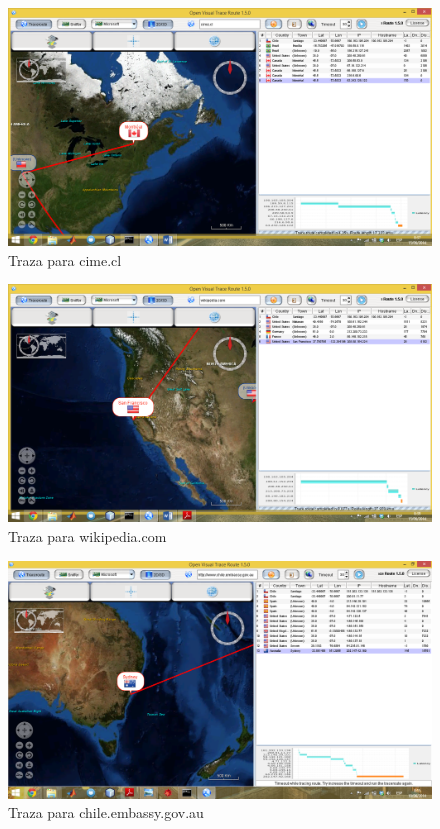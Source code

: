\documentclass[a4paper]{article}
\begin{document}
\begin{figure}[H]
\centering
\includegraphics[width=1\textwidth]{cime_cl.png}
\caption{\label{fig:cime}Traza para cime.cl}
\end{figure}

\begin{figure}[H]
\centering
\includegraphics[width=1\textwidth]{wikipedia_com.png}
\caption{\label{fig:wikipedia}Traza para wikipedia.com}
\end{figure}

\begin{figure}[H]
\centering
\includegraphics[width=1\textwidth]{embassy.png}
\caption{\label{fig:embassy}Traza para chile.embassy.gov.au}
\end{figure}
\end{document}
